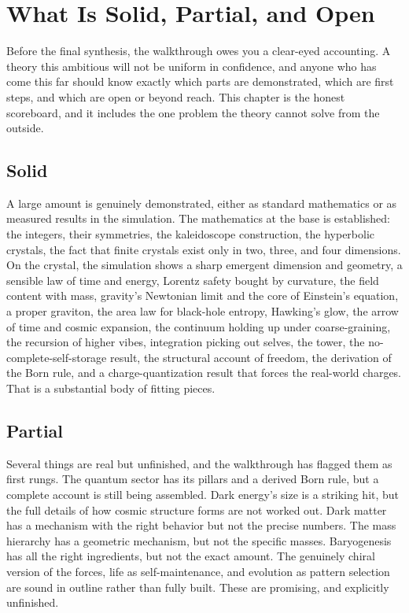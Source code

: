 \section{What Is Solid, Partial, and Open}

Before the final synthesis, the walkthrough owes you a clear-eyed accounting. A theory this ambitious will not be uniform in confidence, and anyone who has come this far should know exactly which parts are demonstrated, which are first steps, and which are open or beyond reach. This chapter is the honest scoreboard, and it includes the one problem the theory cannot solve from the outside.

\subsection{Solid}

A large amount is genuinely demonstrated, either as standard mathematics or as measured results in the simulation. The mathematics at the base is established: the integers, their symmetries, the kaleidoscope construction, the hyperbolic crystals, the fact that finite crystals exist only in two, three, and four dimensions. On the crystal, the simulation shows a sharp emergent dimension and geometry, a sensible law of time and energy, Lorentz safety bought by curvature, the field content with mass, gravity's Newtonian limit and the core of Einstein's equation, a proper graviton, the area law for black-hole entropy, Hawking's glow, the arrow of time and cosmic expansion, the continuum holding up under coarse-graining, the recursion of higher vibes, integration picking out selves, the tower, the no-complete-self-storage result, the structural account of freedom, the derivation of the Born rule, and a charge-quantization result that forces the real-world charges. That is a substantial body of fitting pieces.

\subsection{Partial}

Several things are real but unfinished, and the walkthrough has flagged them as first rungs. The quantum sector has its pillars and a derived Born rule, but a complete account is still being assembled. Dark energy's size is a striking hit, but the full details of how cosmic structure forms are not worked out. Dark matter has a mechanism with the right behavior but not the precise numbers. The mass hierarchy has a geometric mechanism, but not the specific masses. Baryogenesis has all the right ingredients, but not the exact amount. The genuinely chiral version of the forces, life as self-maintenance, and evolution as pattern selection are sound in outline rather than fully built. These are promising, and explicitly unfinished.


